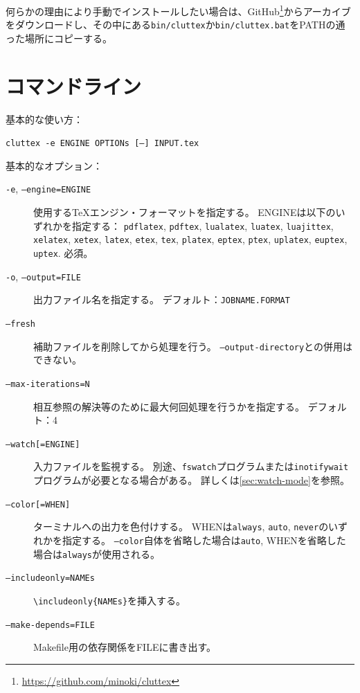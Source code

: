 \documentclass[a4paper]{ltjsreport}
\newcommand\texcmd[1]{\texttt{\textbackslash #1}}
\newcommand\metavar[1]{\textsf{#1}}
\begin{document}
何らかの理由により手動でインストールしたい場合は、GitHub\footnote{\url{https://github.com/minoki/cluttex}}からアーカイブをダウンロードし、その中にある\texttt{bin/cluttex}か\texttt{bin/cluttex.bat}をPATHの通った場所にコピーする。

\section{コマンドライン}
基本的な使い方：
\begin{center}
  \texttt{cluttex -e \metavar{ENGINE} \metavar{OPTIONs} [--] \metavar{INPUT}.tex}
\end{center}

基本的なオプション：
\begin{description}
\item[\texttt{-e}, \texttt{--engine=\metavar{ENGINE}}]
  使用する\TeX{}エンジン・フォーマットを指定する。
  \metavar{ENGINE}は以下のいずれかを指定する：
  \texttt{pdflatex}, \texttt{pdftex},
  \texttt{lualatex}, \texttt{luatex}, \texttt{luajittex},
  \texttt{xelatex}, \texttt{xetex},
  \texttt{latex}, \texttt{etex}, \texttt{tex},
  \texttt{platex}, \texttt{eptex}, \texttt{ptex},
  \texttt{uplatex}, \texttt{euptex}, \texttt{uptex}.
  必須。
\item[\texttt{-o}, \texttt{--output=\metavar{FILE}}]
  出力ファイル名を指定する。
  デフォルト：\texttt{\metavar{JOBNAME}.\metavar{FORMAT}}
\item[\texttt{--fresh}]
  補助ファイルを削除してから処理を行う。
  \texttt{--output-directory}との併用はできない。
\item[\texttt{--max-iterations=\metavar{N}}]
  相互参照の解決等のために最大何回処理を行うかを指定する。
  デフォルト：4
\item[\texttt{--watch[=\metavar{ENGINE}]}]
  入力ファイルを監視する。
  別途、\texttt{fswatch}プログラムまたは\texttt{inotifywait}プログラムが必要となる場合がある。
  詳しくは\cref{sec:watch-mode}を参照。
\item[\texttt{--color[=\metavar{WHEN}]}]
  ターミナルへの出力を色付けする。
  \metavar{WHEN}は\texttt{always}, \texttt{auto}, \texttt{never}のいずれかを指定する。
  \texttt{--color}自体を省略した場合は\texttt{auto}, \metavar{WHEN}を省略した場合は\texttt{always}が使用される。
\item[\texttt{--includeonly=\metavar{NAMEs}}]
  \texttt{\texcmd{includeonly}\{\metavar{NAMEs}\}}を挿入する。
\item[\texttt{--make-depends=\metavar{FILE}}]
  Makefile用の依存関係を\metavar{FILE}に書き出す。

\end{description}
\end{document}

